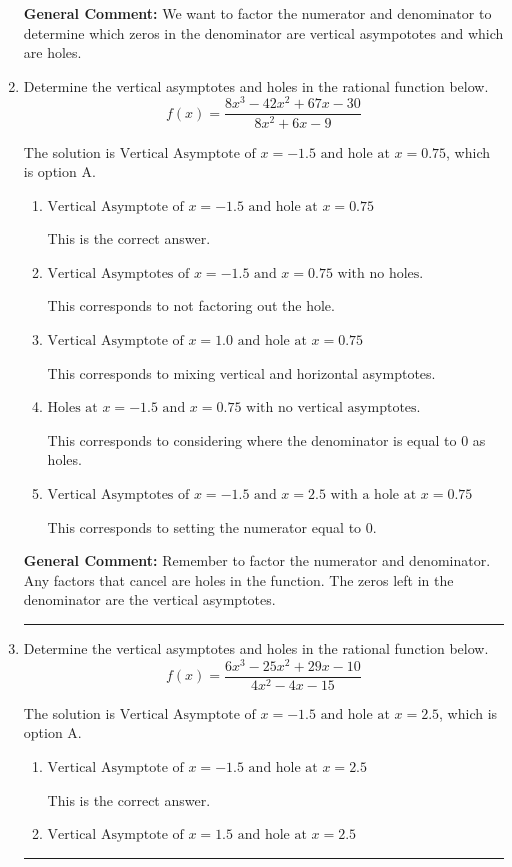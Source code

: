 \documentclass{extbook}[14pt]
\newcommand{\litem}[1]{\item #1

\rule{\textwidth}{0.4pt}}
\begin{document}
\begin{enumerate}
{\textbf{General Comment:} We want to factor the numerator and denominator to determine which zeros in the denominator are vertical asympototes and which are holes.
}
\litem{
Determine the vertical asymptotes and holes in the rational function below.
\[ f(x) = \frac{8x^{3} -42 x^{2} +67 x -30}{8x^{2} +6 x -9} \]

The solution is \( \text{Vertical Asymptote of } x = -1.5 \text{ and hole at } x = 0.75 \), which is option A.\begin{enumerate}[label=\Alph*.]
\item \( \text{Vertical Asymptote of } x = -1.5 \text{ and hole at } x = 0.75 \)

This is the correct answer.
\item \( \text{Vertical Asymptotes of } x = -1.5 \text{ and } x = 0.75 \text{ with no holes.} \)

This corresponds to not factoring out the hole.
\item \( \text{Vertical Asymptote of } x = 1.0 \text{ and hole at } x = 0.75 \)

This corresponds to mixing vertical and horizontal asymptotes.
\item \( \text{Holes at } x = -1.5 \text{ and } x = 0.75 \text{ with no vertical asymptotes.} \)

This corresponds to considering where the denominator is equal to 0 as holes.
\item \( \text{Vertical Asymptotes of } x = -1.5 \text{ and } x = 2.5 \text{ with a hole at } x = 0.75 \)

This corresponds to setting the numerator equal to 0.
\end{enumerate}

\textbf{General Comment:} Remember to factor the numerator and denominator. Any factors that cancel are holes in the function. The zeros left in the denominator are the vertical asymptotes.
}
\litem{
Determine the vertical asymptotes and holes in the rational function below.
\[ f(x) = \frac{6x^{3} -25 x^{2} +29 x -10}{4x^{2} -4 x -15} \]

The solution is \( \text{Vertical Asymptote of } x = -1.5 \text{ and hole at } x = 2.5 \), which is option A.\begin{enumerate}[label=\Alph*.]
\item \( \text{Vertical Asymptote of } x = -1.5 \text{ and hole at } x = 2.5 \)

This is the correct answer.
\item \( \text{Vertical Asymptote of } x = 1.5 \text{ and hole at } x = 2.5 \)


\end{enumerate}}
\end{enumerate}
\end{document}
